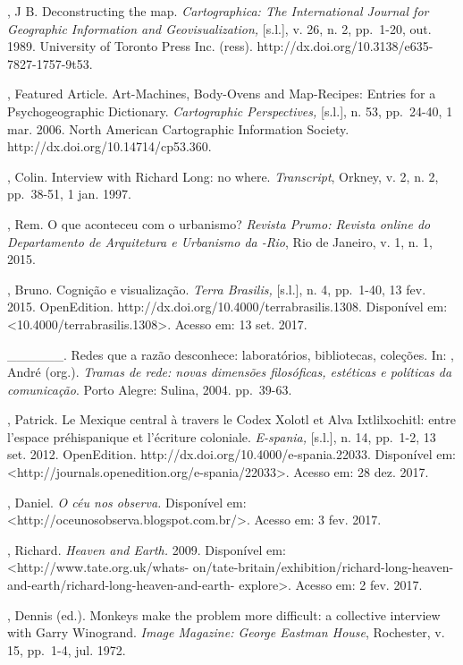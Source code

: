 \begin{Parskip}
, J B. Deconstructing the map. \emph{Cartographica: The
International Journal for Geographic Information and Geovisualization,}
{[}s.l.{]}, v. 26, n. 2, pp.~1-20, out. 1989. University of Toronto Press
Inc. (ress). http://dx.doi.org/10.3138/e635-7827-1757-9t53.

, Featured Article. Art-Machines, Body-Ovens and Map-Recipes:
Entries for a Psychogeographic Dictionary. \emph{Cartographic
Perspectives,} {[}s.l.{]}, n. 53, pp.~24-40, 1 mar. 2006. North American
Cartographic Information Society. http://dx.doi.org/10.14714/cp53.360.

, Colin. Interview with Richard Long: no where.
\emph{Transcript}, Orkney, v. 2, n. 2, pp.~38-51, 1 jan. 1997.

, Rem. O que aconteceu com o urbanismo? \emph{Revista Prumo:
Revista online do Departamento de Arquitetura e Urbanismo da -Rio},
Rio de Janeiro, v. 1, n. 1, 2015.

, Bruno. Cognição e visualização. \emph{Terra Brasilis,}
{[}s.l.{]}, n. 4, pp.~1-40, 13 fev. 2015. OpenEdition.
http://dx.doi.org/10.4000/terrabrasilis.1308. Disponível em:
\textless{}10.4000/terrabrasilis.1308\textgreater{}. Acesso em: 13 set.
2017.

\_\_\_\_\_\_. Redes que a razão desconhece: laboratórios,
bibliotecas, coleções. In: , André (org.). \emph{Tramas de
rede: novas dimensões filosóficas, estéticas e políticas da
comunicação}. Porto Alegre: Sulina, 2004. pp.~39-63.

, Patrick. Le Mexique central à travers le Codex Xolotl et Alva
Ixtlilxochitl: entre l'espace préhispanique et l'écriture coloniale.
\emph{E-spania,} {[}s.l.{]}, n. 14, pp.~1-2, 13 set. 2012. OpenEdition.
http://dx.doi.org/10.4000/e-spania.22033. Disponível em:
\textless{}http://journals.openedition.org/e-spania/22033\textgreater{}.
Acesso em: 28 dez. 2017.

, Daniel. \emph{O céu nos observa.} Disponível em:
\textless{}http://oceunosobserva.blogspot.com.br/\textgreater{}. Acesso
em: 3 fev. 2017.

, Richard. \emph{Heaven and Earth.} 2009. Disponível em:
\textless{}http://www.tate.org.uk/whats-
on/tate-britain/exhibition/richard-long-heaven-and-earth/richard-long-heaven-and-earth-
explore\textgreater{}. Acesso em: 2 fev. 2017.

, Dennis (ed.). Monkeys make the problem more difficult: a
collective interview with Garry Winogrand. \emph{Image Magazine:
George Eastman House}, Rochester, v. 15, pp.~1-4, jul. 1972.


\end{Parskip}
